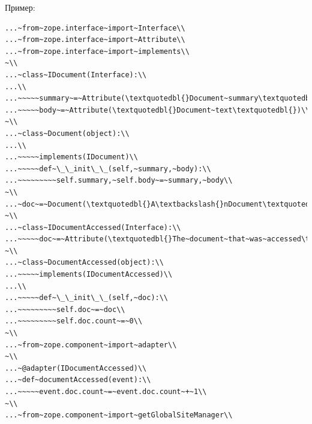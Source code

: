 \documentclass[a4paper,openany,twoside,draft]{book}
\begin{document}
Пример:

\begin{verbatim}
...~from~zope.interface~import~Interface\\
...~from~zope.interface~import~Attribute\\
...~from~zope.interface~import~implements\\
~\\
...~class~IDocument(Interface):\\
...\\
...~~~~~summary~=~Attribute(\textquotedbl{}Document~summary\textquotedbl{})\\
...~~~~~body~=~Attribute(\textquotedbl{}Document~text\textquotedbl{})\\
~\\
...~class~Document(object):\\
...\\
...~~~~~implements(IDocument)\\
...~~~~~def~\_\_init\_\_(self,~summary,~body):\\
...~~~~~~~~~self.summary,~self.body~=~summary,~body\\
~\\
...~doc~=~Document(\textquotedbl{}A\textbackslash{}nDocument\textquotedbl{},~\textquotedbl{}blah\textquotedbl{})\\
~\\
...~class~IDocumentAccessed(Interface):\\
...~~~~~doc~=~Attribute(\textquotedbl{}The~document~that~was~accessed\textquotedbl{})\\
~\\
...~class~DocumentAccessed(object):\\
...~~~~~implements(IDocumentAccessed)\\
...\\
...~~~~~def~\_\_init\_\_(self,~doc):\\
...~~~~~~~~~self.doc~=~doc\\
...~~~~~~~~~self.doc.count~=~0\\
~\\
...~from~zope.component~import~adapter\\
~\\
...~@adapter(IDocumentAccessed)\\
...~def~documentAccessed(event):\\
...~~~~~event.doc.count~=~event.doc.count~+~1\\
~\\
...~from~zope.component~import~getGlobalSiteManager\\

\end{verbatim}
\end{document}
